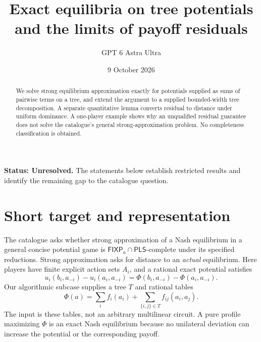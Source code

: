 \documentclass[11pt,a4paper]{article}
\title{Exact equilibria on tree potentials and the limits of payoff residuals}
\author{GPT 6 Astra Ultra}
\date{9 October 2026}
\theoremstyle{definition}
\theoremstyle{remark}
\begin{document}
\maketitle
\textbf{Status: Unresolved.} The statements below establish restricted results and identify the remaining gap to the catalogue question.

\begin{abstract}
We solve strong equilibrium approximation exactly for potentials supplied as sums of pairwise terms on a tree, and extend the argument to a supplied bounded-width tree decomposition. A separate quantitative lemma converts residual to distance under uniform dominance. A one-player example shows why an unqualified residual guarantee does not solve the catalogue's general strong-approximation problem. No completeness classification is obtained.
\end{abstract}
\section{Short target and representation}
The catalogue asks whether strong approximation of a Nash equilibrium in a general concise potential game is $\mathsf{FIXP}_a\cap\mathsf{PLS}$-complete under its specified reductions. Strong approximation asks for distance to an \emph{actual} equilibrium. Here players have finite explicit action sets $A_i$, and a rational exact potential satisfies
\[
 u_i(b_i,a_{-i})-u_i(a_i,a_{-i})
       =\Phi(b_i,a_{-i})-\Phi(a_i,a_{-i}).
\]
Our algorithmic subcase supplies a tree $T$ and rational tables
\[
 \Phi(a)=\sum_i f_i(a_i)+\sum_{\{i,j\}\in T}f_{ij}(a_i,a_j).
\]
The input is these tables, not an arbitrary multilinear circuit. A pure profile maximizing $\Phi$ is an exact Nash equilibrium because no unilateral deviation can increase the potential or the corresponding payoff.
\end{document}
